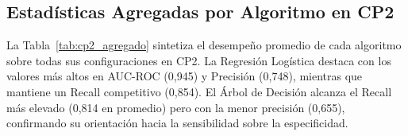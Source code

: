 \documentclass[12pt, letterpaper, openany]{report}
\begin{document}
\begin{table}[!htbp]
  \centering
  \caption{Selección de modelos por perfil operativo --- CP2 (semana~11). Búsqueda global sobre 80 experimentos con AUC-ROC $\geq 0{,}75$. A diferencia de CP1, los tres perfiles seleccionan algoritmos distintos. $\tau^*$: umbral óptimo de clasificación.}
  \label{tab:cp2_master}
  \small
\end{table}

\FloatBarrier

\subsection{Estadísticas Agregadas por Algoritmo en CP2}

La Tabla~\ref{tab:cp2_agregado} sintetiza el desempeño promedio de cada algoritmo sobre todas sus configuraciones en CP2. La Regresión Logística destaca con los valores más altos en AUC-ROC (0,945) y Precisión (0,748), mientras que mantiene un Recall competitivo (0,854). El Árbol de Decisión alcanza el Recall más elevado (0,814 en promedio) pero con la menor precisión (0,655), confirmando su orientación hacia la sensibilidad sobre la especificidad.
\end{document}
